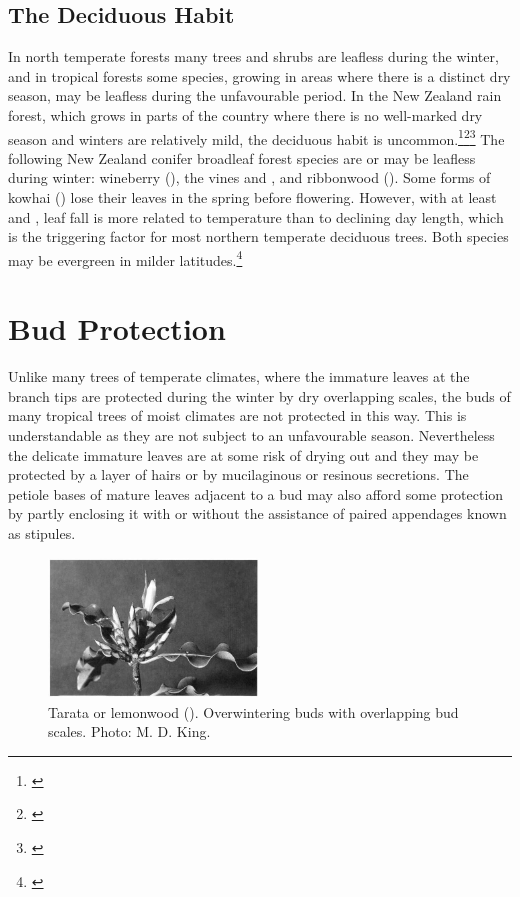 \subsection{The Deciduous Habit}

In north temperate forests many trees and shrubs are leafless during the winter, and in tropical forests some species, growing in areas where there is a distinct dry season, may be leafless during the unfavourable period.
In the New Zealand rain forest, which grows in parts of the country where there is no well-marked dry season and winters are relatively mild, the deciduous habit is uncommon.\footnote{\cite{bussell1968growth}}\footnote{\cite{bussell1968effects}}\footnote{\cite{russel1936mechanism}} The following New Zealand conifer broadleaf forest species are or may be leafless during winter: wineberry (), the vines  and , and ribbonwood ().
Some forms of kowhai () lose their leaves in the spring before flowering.
However, with at least  and , leaf fall is more related to temperature than to declining day length, which is the triggering factor for most northern temperate deciduous trees.
Both species may be evergreen in milder latitudes.\footnote{\cite{cockayne1928vegetation}}

\section{Bud Protection}

Unlike many trees of temperate climates, where the immature leaves at the branch tips are protected during the winter by dry overlapping scales, the buds of many tropical trees of moist climates are not protected in this way.
This is understandable as they are not subject to an unfavourable season.
Nevertheless the delicate immature leaves are at some risk of drying out and they may be protected by a layer of hairs or by mucilaginous or resinous secretions.
The petiole bases of mature leaves adjacent to a bud may also afford some protection by partly enclosing it with or without the assistance of paired appendages known as stipules.

\begin{figure}
	\includegraphics[width=0.5\textwidth]{graphics/figure24tarata.jpg}
	\centering
	\caption[Tarata or lemonwood]{Tarata or lemonwood (). Overwintering buds with overlapping bud scales. Photo: M. D. King.}%
	\label{fig:24tarata}
\end{figure}

